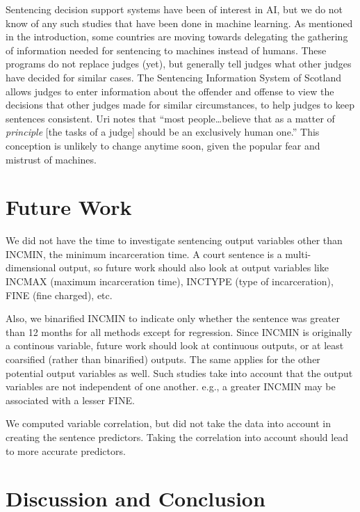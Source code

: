\documentclass[11pt,letter]{article}
\begin{document}
Sentencing decision support systems have been of interest in AI, but we do not know of any such studies that have been done in machine learning. As mentioned in the introduction, some countries are moving towards delegating the gathering of information needed for sentencing to machines instead of humans. These programs do not replace judges (yet), but generally tell judges what other judges have decided for similar cases. 
The Sentencing Information System of Scotland allows judges to enter information about the offender and offense to view the decisions that other judges made for similar circumstances, to help judges to keep sentences consistent. Uri notes that ``most people\ldots believe that as a matter of \emph{principle} [the tasks of a judge] should be an exclusively human one.'' This conception is unlikely to change anytime soon, given the popular fear and mistrust of machines. 


\section{Future Work}
We did not have the time to investigate sentencing output variables other than INCMIN, the minimum incarceration time. A court sentence is a multi-dimensional output, so future work should also look at output variables like INCMAX (maximum incarceration time), INCTYPE (type of incarceration), FINE (fine charged), etc. 

Also, we binarified INCMIN to indicate only whether the sentence was greater than 12 months for all methods except for regression. Since INCMIN is originally a continous variable, future work should look at continuous outputs, or at least coarsified (rather than binarified) outputs. The same applies for the other potential output variables as well. Such studies take into account that the output variables are not independent of one another. e.g., a greater INCMIN may be associated with a lesser FINE. 

We computed variable correlation, but did not take the data into account in creating the sentence predictors. Taking the correlation into account should lead to more accurate predictors.

\section{Discussion and Conclusion}
\end{document}

